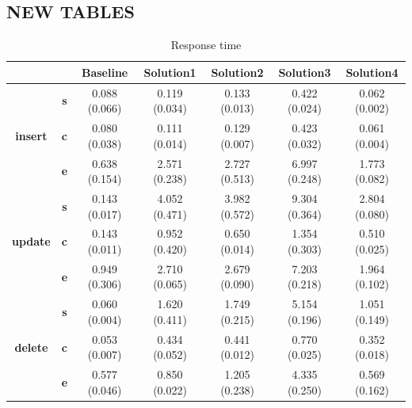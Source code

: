 \subsection{NEW TABLES}
\begin{table}[h]
\centering
\caption{Response time}\label{t:}
\begin{tabular}{ccccccc}
\toprule
&&\textbf{Baseline} & \textbf{Solution1} & \textbf{Solution2} & \textbf{Solution3} & \textbf{Solution4}\\
\midrule
\multirow{3}{*}{\textbf{insert}} & \textbf{s} & 0.088 (0.066) & 0.119 (0.034) & 0.133 (0.013) & 0.422 (0.024) & 0.062 (0.002)\\
 & \textbf{c} & 0.080 (0.038) & 0.111 (0.014) & 0.129 (0.007) & 0.423 (0.032) & 0.061 (0.004)\\
 & \textbf{e} & 0.638 (0.154) & 2.571 (0.238) & 2.727 (0.513) & 6.997 (0.248) & 1.773 (0.082)\\
\midrule
\multirow{3}{*}{\textbf{update}} & \textbf{s} & 0.143 (0.017) & 4.052 (0.471) & 3.982 (0.572) & 9.304 (0.364) & 2.804 (0.080)\\
 & \textbf{c} & 0.143 (0.011) & 0.952 (0.420) & 0.650 (0.014) & 1.354 (0.303) & 0.510 (0.025)\\
 & \textbf{e} & 0.949 (0.306) & 2.710 (0.065) & 2.679 (0.090) & 7.203 (0.218) & 1.964 (0.102)\\
\midrule
\multirow{3}{*}{\textbf{delete}} & \textbf{s} & 0.060 (0.004) & 1.620 (0.411) & 1.749 (0.215) & 5.154 (0.196) & 1.051 (0.149)\\
 & \textbf{c} & 0.053 (0.007) & 0.434 (0.052) & 0.441 (0.012) & 0.770 (0.025) & 0.352 (0.018)\\
 & \textbf{e} & 0.577 (0.046) & 0.850 (0.022) & 1.205 (0.238) & 4.335 (0.250) & 0.569 (0.162)\\
\bottomrule
\end{tabular}
\end{table}



